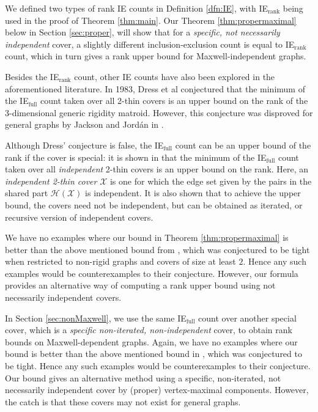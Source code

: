 \documentclass[10pt]{article}
\def\H{\mathcal {H}}
\def\X{\mathcal {X}}
\begin{document}
\medskip\noindent
We defined two types of rank IE counts in Definition \ref{dfn:IE}, with IE$_\text{rank}$ being used in the proof of Theorem \ref{thm:main}. Our Theorem \ref{thm:propermaximal} below in Section \ref{sec:proper}, will show that for a {\em specific, not necessarily independent} cover, a slightly different inclusion-exclusion count is equal to IE$_\text{rank}$ count, which in turn gives a rank upper bound for Maxwell-independent graphs. 


\medskip\noindent
Besides the IE$_\text{rank}$ count, other IE counts have also been explored in the aforementioned literature.
In 1983, Dress et al \cite{bib:Dress,bib:Tay84} conjectured that the minimum of the IE$_\text{full}$ count taken over all 2-thin covers is an upper bound on the rank of the 3-dimensional generic rigidity matroid. However,
this conjecture was disproved for general graphs by Jackson and Jord\'an in
\cite{Jackson03thedress}. 

\medskip\noindent
Although Dress' conjecture is false, the IE$_\text{full}$ count can be an upper bound of the rank if the cover is special: it is shown in \cite{JacksonJordanrank:2006} that the minimum of the IE$_\text{full}$ count taken over all {\em independent} 2-thin covers is an upper bound on the rank. Here, an {\em independent 2-thin cover} $\X$ is one for which the edge set given by the pairs in the shared part $\H(\X)$ is independent. It is also shown that to achieve the upper bound, the covers need not be independent, but can be obtained as iterated, or recursive version of independent covers. 

\medskip\noindent
We have no examples where our bound in Theorem \ref{thm:propermaximal} is better than the above mentioned bound from \cite{JacksonJordanrank:2006}, which was conjectured to be tight when restricted to non-rigid graphs and covers of size at least $2$. Hence any such examples would be counterexamples to their conjecture.
However, our formula provides an alternative way of computing a rank upper bound using not necessarily independent covers.

\medskip\noindent
In Section \ref{sec:nonMaxwell}, we use the same IE$_{\text{full}}$ count
over another special cover, which is a {\em specific non-iterated, non-independent} cover, to obtain rank bounds on Maxwell-dependent graphs. 
Again, we have no examples where our
bound is better than the above mentioned bound in \cite{JacksonJordanrank:2006}, which was conjectured to be tight. Hence any such examples would be counterexamples to their
conjecture. Our bound gives an alternative method using a specific,
non-iterated, not necessarily independent cover by (proper) vertex-maximal components. However, the catch is that these covers may not exist for general graphs.
\end{document}
